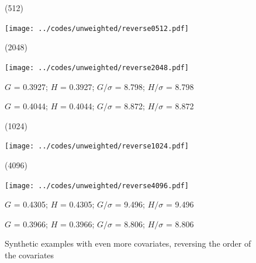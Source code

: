 \documentclass{article}
\newlength{\vertsep}
\newlength{\imsize}
\newlength{\imsized}
\begin{document}
\begin{figure}
\begin{centering}
(512) \parbox{\imsize}{\texttt{[image: ../codes/unweighted/reverse0512.pdf]}}
\quad
(2048) \parbox{\imsize}{\texttt{[image: ../codes/unweighted/reverse2048.pdf]}}

\parbox{\imsized}{\hfil \footnotesize $G$ = 0.3927; $H$ = 0.3927;
$G/\sigma$ = 8.798; $H/\sigma$ = 8.798}
\parbox{\imsized}{\hfil \footnotesize $G$ = 0.4044; $H$ = 0.4044;
$G/\sigma$ = 8.872; $H/\sigma$ = 8.872}

\vspace{\vertsep}

(1024) \parbox{\imsize}{\texttt{[image: ../codes/unweighted/reverse1024.pdf]}}
\quad
(4096) \parbox{\imsize}{\texttt{[image: ../codes/unweighted/reverse4096.pdf]}}

\parbox{\imsized}{\hfil \footnotesize $G$ = 0.4305; $H$ = 0.4305;
$G/\sigma$ = 9.496; $H/\sigma$ = 9.496}
\parbox{\imsized}{\hfil \footnotesize $G$ = 0.3966; $H$ = 0.3966;
$G/\sigma$ = 8.806; $H/\sigma$ = 8.806}
\end{centering}
\caption{Synthetic examples with even more covariates,
reversing the order of the covariates}
\label{reverses}
\end{figure}
\end{document}
